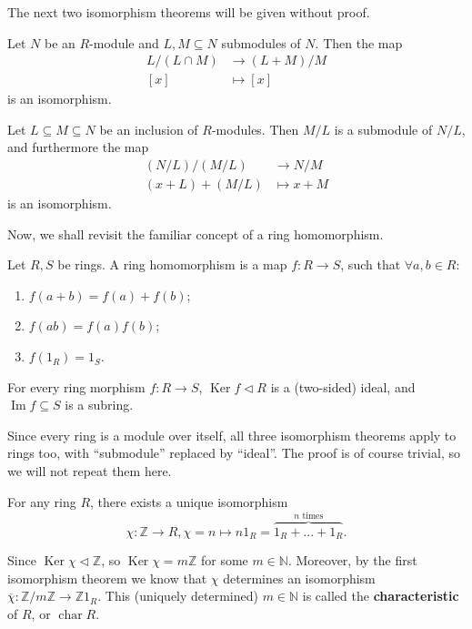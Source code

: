 \documentclass[12pt, a4paper, titlepage]{report}
\DeclareMathOperator{\Ker}{Ker}
\DeclareMathOperator{\Ima}{Im}
\DeclareMathOperator{\chara}{char}
\begin{document}
The next two isomorphism theorems will be given without proof.

\begin{thm}
  Let $N$ be an $R$-module and $L, M \subseteq N$ submodules of $N$. Then the map
  \begin{align*}
    L \big/ (L \cap M) &\to (L + M) \big/ M\\
    [x] &\mapsto [x]
  \end{align*}
  is an isomorphism.
\end{thm}

\begin{thm}
  Let $L \subseteq M \subseteq N$ be an inclusion of $R$-modules. Then $M/L$ is a submodule of $N/L$,
  and furthermore the map
  \begin{align*}
    (N/L) \big/ (M/L) &\to N \big/ M\\
    (x + L) + (M/L) &\mapsto x + M
  \end{align*}
  is an isomorphism.
\end{thm}

Now, we shall revisit the familiar concept of a ring homomorphism.

\begin{defn}
  Let $R, S$ be rings. A ring homomorphism is a map $f : R \to S$, such that $\forall a, b \in R$:
  \begin{enumerate}
  \item $f(a+b) = f(a) + f(b)$;
  \item $f(ab) = f(a)f(b)$;
  \item $f(1_R) = 1_S$.
  \end{enumerate}
\end{defn}

\begin{rem}
  For every ring morphism $f : R \to S$, $\Ker f \lhd R$ is a (two-sided) ideal, and $\Ima f \subseteq S$ is a
  subring.
\end{rem}

Since every ring is a module over itself, all three isomorphism theorems apply to rings too, with ``submodule''
replaced by ``ideal''. The proof is of course trivial, so we will not repeat them here.

\begin{exmp}
  For any ring $R$, there exists a unique isomorphism
  \[
    \chi : \mathbb{Z} \to R, \chi = n \mapsto n1_R = \overbrace{1_R + ... + 1_R}^{n \text{ times}}.
  \]
  
  Since $\Ker \chi \lhd \mathbb{Z}$, so $\Ker \chi = m\mathbb{Z}$ for some $m \in \mathbb{N}$.
  Moreover, by the first isomorphism theorem we know that $\chi$ determines an isomorphism
  $\overline{\chi} : \mathbb{Z}/m\mathbb{Z} \to \mathbb{Z}1_R$. This (uniquely determined) $m \in \mathbb{N}$ is
  called the \textbf{characteristic} of $R$, or $\chara R$.
\end{exmp}
\end{document}
